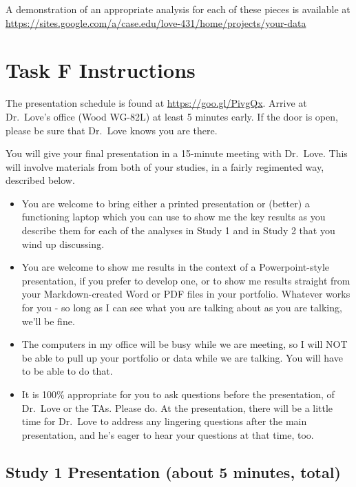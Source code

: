 \documentclass[]{book}
\providecommand{\tightlist}{%
  \setlength{\itemsep}{0pt}\setlength{\parskip}{0pt}}
\theoremstyle{definition}
\theoremstyle{definition}
\theoremstyle{definition}
\theoremstyle{remark}
\begin{document}
A demonstration of an appropriate analysis for each of these pieces is
available at
\url{https://sites.google.com/a/case.edu/love-431/home/projects/your-data}

\hypertarget{task-f-instructions}{%
\chapter{Task F Instructions}\label{task-f-instructions}}

The presentation schedule is found at \url{https://goo.gl/PivgQx}.
Arrive at Dr.~Love's office (Wood WG-82L) at least 5 minutes early. If
the door is open, please be sure that Dr.~Love knows you are there.

You will give your final presentation in a 15-minute meeting with
Dr.~Love. This will involve materials from both of your studies, in a
fairly regimented way, described below.

\begin{itemize}
\tightlist
\item
  You are welcome to bring either a printed presentation or (better) a
  functioning laptop which you can use to show me the key results as you
  describe them for each of the analyses in Study 1 and in Study 2 that
  you wind up discussing.
\item
  You are welcome to show me results in the context of a
  Powerpoint-style presentation, if you prefer to develop one, or to
  show me results straight from your Markdown-created Word or PDF files
  in your portfolio. Whatever works for you - so long as I can see what
  you are talking about as you are talking, we'll be fine.
\item
  The computers in my office will be busy while we are meeting, so I
  will NOT be able to pull up your portfolio or data while we are
  talking. You will have to be able to do that.
\item
  It is 100\% appropriate for you to ask questions before the
  presentation, of Dr.~Love or the TAs. Please do. At the presentation,
  there will be a little time for Dr.~Love to address any lingering
  questions after the main presentation, and he's eager to hear your
  questions at that time, too.
\end{itemize}

\hypertarget{study-1-presentation-about-5-minutes-total}{%
\section{Study 1 Presentation (about 5 minutes,
total)}\label{study-1-presentation-about-5-minutes-total}}
\end{document}
